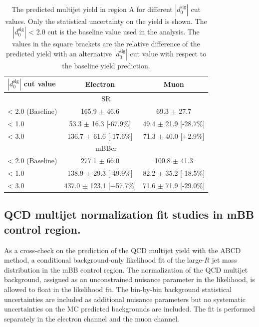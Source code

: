 \begin{table}[!htbp]
\begin{center}
\begin{tabular}{l|c|c}
$|d_{0}^{\textrm{sig}}|$ cut value     & Electron       & Muon        \\
\hline        
\multicolumn{3}{c}{SR} \\
\hline
< 2.0  (Baseline)       & 165.9 $\pm$ 46.6              & 69.3 $\pm$ 27.7 \\
< 1.0                   & 53.3  $\pm$ 16.3 [-67.9\%]    & 49.4 $\pm$ 21.9 [-28.7\%] \\  
< 3.0                   & 136.7 $\pm$ 61.6 [-17.6\%]    & 71.3 $\pm$ 40.0 [+2.9\%] \\    
\hline 
\multicolumn{3}{c}{mBBcr} \\
\hline
< 2.0 (Baseline)       & 277.1 $\pm$ 66.0             & 100.8 $\pm$ 41.3 \\
< 1.0                  & 138.9 $\pm$ 29.3  [-49.9\%]  & 82.2 $\pm$ 35.2 [-18.5\%]  \\          
< 3.0                  & 437.0 $\pm$ 123.1 [+57.7\%]  & 71.6 $\pm$ 71.9 [-29.0\%] \\     
\end{tabular}
\end{center}
\caption{The predicted multijet yield in region A for different $|d_{0}^{\textrm{sig}}|$ cut values. 
Only the statistical uncertainty on the yield is shown. The $|d_{0}^{\textrm{sig}}|$ < 2.0 cut is 
the baseline value used in the analysis. The values in the square brackets are the relative difference 
of the predicted yield with an alternative $|d_{0}^{\textrm{sig}}|$ cut value with respect to the 
baseline yield prediction.}
\label{tab:boosted_syst_qcd_norm_d0cut}
\end{table}

\FloatBarrier
%
%
\subsection{QCD multijet normalization fit studies in mBB control region.}
\label{app:boosted_qcd_float_2tag_mbbcr_fit}

As a cross-check on the prediction of the QCD multijet yield with the ABCD method, a conditional background-only
likelihood fit of the large-$R$ jet mass distribution in the mBB control region. The normalization of the QCD multijet background,
assigned as an unconstrained nuisance parameter in the likelihood, is allowed to float in the likelihood fit. 
The bin-by-bin background statistical uncertainties are included as additional nuisance parameters but no systematic uncertainties 
on the MC predicted backgrounds are included. The fit is performed separately in the electron channel and the muon channel.

